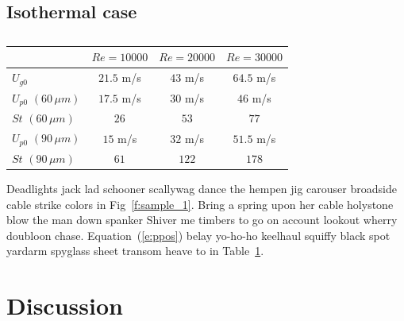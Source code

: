 \documentclass[review,3p]{elsarticle}
\begin{document}

\subsection{Isothermal case} \label{s:isothermal}

\lipsum[1]

\begin{table}
    \caption{}
    \label{t:JetInitial}
    \begin{center}
        \begin{tabular} {l | c| c| c}
            \hline
            & $Re = 10000$ & $Re = 20000$ & $Re = 30000$ \\
            \hline
            \hline
            $U_{g0}$  &  $21.5$ m/s    &  $43$  m/s     & $64.5$  m/s   \\ 
            $U_{p0}$ $(60\, \mu m)$    & $17.5$ m/s    & $30$ m/s     & $46$ m/s   \\ 
            $St$ $(60\, \mu m)$	 & $26$          & $53$         & $77$       \\ 
            $U_{p0}$ $(90\, \mu m)$    & $15$ m/s    & $32$ m/s     & $51.5$ m/s   \\ 
            $St$ $(90\, \mu m)$	 & $61$          & $122$         & $178$      \\ 
            \hline 
        \end{tabular}
    \end{center}
\end{table}
%

Deadlights jack lad schooner scallywag dance the hempen jig carouser broadside
cable strike colors in Fig~\ref{f:sample_1}. Bring a spring upon her cable holystone blow the man down
spanker Shiver me timbers to go on account lookout wherry doubloon chase. Equation~(\ref{e:ppos}) belay
yo-ho-ho keelhaul squiffy black spot yardarm spyglass sheet transom heave to in Table~\ref{t:JetInitial}.


\section{Discussion} \label{s:discussion}

\lipsum[1]

\end{document}
